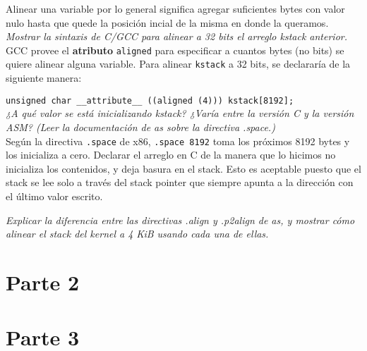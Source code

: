 \documentclass{article}
\begin{document}
Alinear una variable por lo general significa agregar suficientes bytes con valor nulo hasta que quede la posición incial de la misma en donde la queramos. \\

\textit{Mostrar la sintaxis de C/GCC para alinear a 32 bits el arreglo kstack anterior.}\\
GCC provee el \textbf{atributo} \texttt{aligned} para especificar a cuantos bytes (no bits) se quiere alinear alguna variable. Para alinear \texttt{kstack} a 32 bits, se declararía de la siguiente manera:
                                                                                
\texttt{unsigned char \_\_attribute\_\_ ((aligned (4))) kstack[8192];}\\

\textit{¿A qué valor se está inicializando kstack? ¿Varía entre la versión C y la versión ASM? (Leer la documentación de as sobre la directiva .space.)}\\
Según la directiva \texttt{.space} de x86, \texttt{.space 8192} toma los próximos 8192 bytes y los inicializa a cero. Declarar el arreglo en C de la manera que lo hicimos no inicializa los contenidos, y deja basura en el stack. Esto es aceptable puesto que el stack se lee solo a través del stack pointer que siempre apunta a la dirección con el último valor escrito.

\textit{Explicar la diferencia entre las directivas .align y .p2align de as, y mostrar cómo alinear el stack del kernel a 4 KiB usando cada una de ellas.}












%

\newpage

\section{Parte 2}

\newpage

\section{Parte 3}
\end{document}
